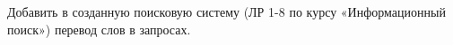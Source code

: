
Добавить в созданную поисковую систему (ЛР 1-8 по курсу «Информационный поиск»)
перевод слов в запросах.

\pagebreak
